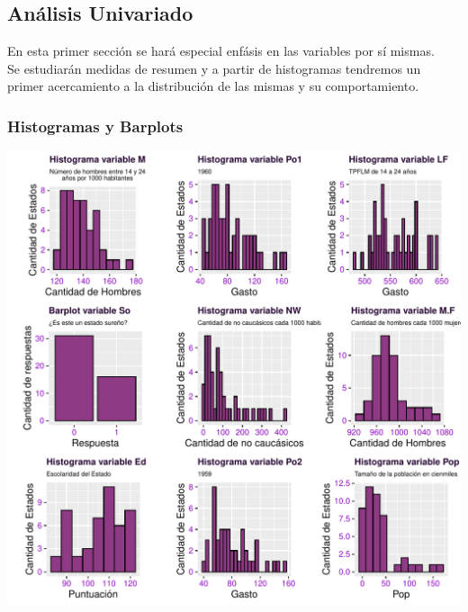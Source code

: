 \documentclass[11pt,a4paper]{article}\usepackage[]{graphicx}\usepackage[]{color}
\makeatletter
\def\maxwidth{ %
  \ifdim\Gin@nat@width>\linewidth
    \linewidth
  \else
    \Gin@nat@width
  \fi
}
\newenvironment{knitrout}{}{} %
\makeatother
\begin{document}
\subsection{Análisis Univariado}
En esta primer sección se hará especial enfásis en las variables por sí mismas.
\\

Se estudiarán medidas de resumen y a partir de histogramas tendremos un primer acercamiento a la distribución de las mismas y su comportamiento.

\newpage
\subsubsection{Histogramas y Barplots}
\centering
\begin{knitrout}
\color{fgcolor}
\includegraphics[width=\maxwidth]{figure/unnamed-chunk-3-1} 

\end{knitrout}
\newpage
\centering
\end{document}
